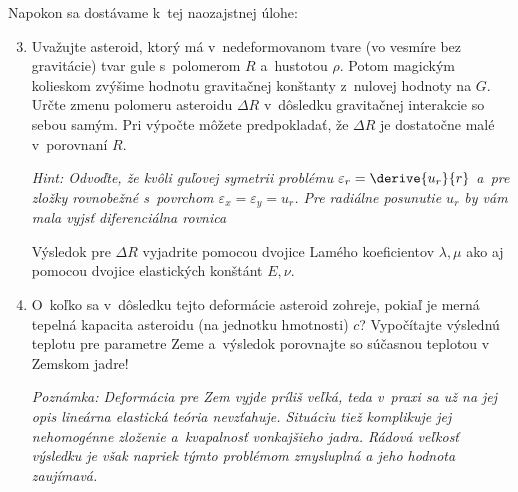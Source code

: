Napokon sa dostávame k~tej naozajstnej úlohe:
\begin{enumerate}[label=\alph*)]
	\setcounter{enumi}{2}
	\item Uvažujte asteroid, ktorý má v~nedeformovanom tvare (vo vesmíre bez gravitácie) tvar gule
	s~polomerom $R$ a~hustotou $\rho$. Potom magickým kolieskom zvýšime hodnotu gravitačnej konštanty
	z~nulovej hodnoty na $G$. Určte zmenu polomeru asteroidu $\Delta R$ v~dôsledku gravitačnej interakcie
	so sebou samým. Pri výpočte môžete predpokladať, že $\Delta R$ je dostatočne malé v~porovnaní $R$.

	\emph{Hint: Odvoďte, že kvôli guľovej symetrii problému $\varepsilon_r = \derive{u_r}{r}$
	a~pre zložky rovnobežné s~povrchom $\varepsilon_x = \varepsilon_y = u_r$.
	Pre radiálne posunutie $u_r$ by vám mala vyjsť diferenciálna rovnica
	}

	Výsledok pre $\Delta R$ vyjadrite pomocou dvojice Lamého koeficientov $\lambda,\mu$
	ako aj pomocou dvojice elastických konštánt $E,\nu$.

	\item O~koľko sa v~dôsledku tejto deformácie asteroid zohreje, pokiaľ je merná tepelná kapacita
	asteroidu (na jednotku hmotnosti) $c$? Vypočítajte výslednú teplotu pre parametre Zeme a~výsledok
	porovnajte so súčasnou teplotou v Zemskom jadre!

	\emph{Poznámka: Deformácia pre Zem vyjde príliš veľká, teda v~praxi sa už na jej opis lineárna
	elastická teória nevzťahuje. Situáciu tiež komplikuje jej nehomogénne zloženie a~kvapalnosť
	vonkajšieho jadra. Rádová veľkosť výsledku je však napriek týmto problémom zmysluplná a jeho hodnota zaujímavá.}
\end{enumerate}
